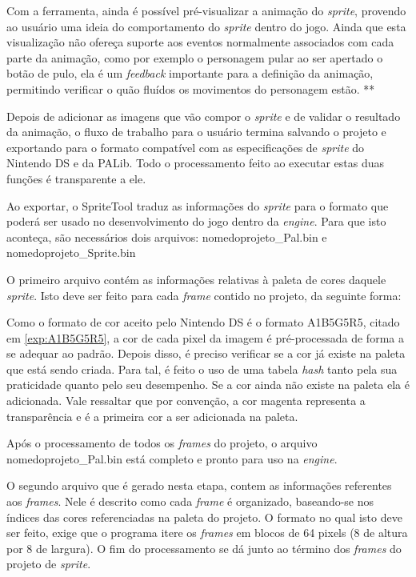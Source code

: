 \documentclass[brazil]{abnt}
\begin{document}
Com a ferramenta, ainda é possível pré-visualizar a animação do \textit{sprite}, provendo ao usuário uma ideia do comportamento do \textit{sprite} dentro do jogo. Ainda que esta  visualização não ofereça suporte aos eventos normalmente associados com cada parte da animação, como por exemplo o personagem pular ao ser apertado o botão de pulo, ela é um \textit{feedback} importante para a definição da animação, permitindo verificar o quão fluídos os movimentos do personagem estão. **

Depois de adicionar as imagens que vão compor o \textit{sprite} e de validar o resultado da animação, o fluxo de trabalho para o usuário termina salvando o projeto e exportando para o formato compatível com as especificações de \textit{sprite} do Nintendo DS e da PALib. Todo o processamento feito ao executar estas duas funções é transparente a ele. 

Ao exportar, o SpriteTool traduz as informações do \textit{sprite} para o formato que poderá ser usado no desenvolvimento do jogo dentro da \textit{engine}. Para que isto aconteça, são necessários dois arquivos: nomedoprojeto\_Pal.bin e nomedoprojeto\_Sprite.bin

O primeiro arquivo contém as informações relativas à paleta de cores daquele \textit{sprite}. Isto deve ser feito para cada \textit{frame} contido no projeto, da seguinte forma:

Como o formato de cor aceito pelo Nintendo DS é o formato A1B5G5R5, citado em \ref{exp:A1B5G5R5}, a cor de cada pixel da imagem é pré-processada de forma a se adequar ao padrão. Depois disso, é preciso verificar se a cor já existe na paleta que está sendo criada. Para tal, é feito o uso de uma tabela \textit{hash} tanto pela sua praticidade quanto pelo seu desempenho. Se a cor ainda não existe na paleta ela é adicionada. Vale ressaltar que por convenção, a cor magenta representa a transparência e é a primeira cor a ser adicionada na paleta. 

Após o processamento de todos os \textit{frames} do projeto, o arquivo nomedoprojeto\_Pal.bin está completo e pronto para uso na \textit{engine}.

O segundo arquivo que é gerado nesta etapa, contem as informações referentes aos \textit{frames}. Nele é descrito como cada \textit{frame} é organizado, baseando-se nos índices das cores referenciadas na paleta do projeto. O formato no qual isto deve ser feito, exige que o programa itere os \textit{frames} em blocos de 64 pixels (8 de altura por 8 de largura). O fim do processamento se dá junto ao término dos \textit{frames} do projeto de \textit{sprite}. 
\end{document}
